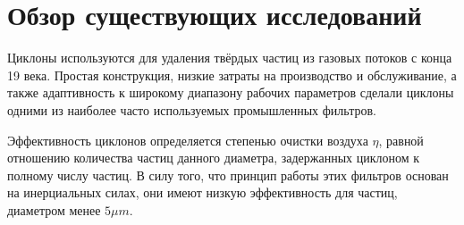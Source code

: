 \section{Обзор существующих исследований}
	Циклоны используются для удаления твёрдых частиц из газовых потоков с конца 19 века. Простая конструкция, низкие затраты на производство и обслуживание, а также адаптивность к широкому диапазону рабочих параметров сделали циклоны одними из наиболее часто используемых промышленных фильтров. 
	
		Эффективность циклонов определяется степенью очистки воздуха $\eta$, равной отношению количества частиц данного диаметра, задержанных циклоном к полному числу частиц. В силу того, что принцип работы этих фильтров основан на инерциальных силах, они имеют низкую эффективность для частиц, диаметром менее $5 \mu m$.
	
